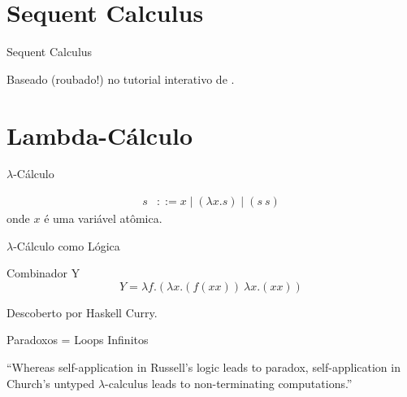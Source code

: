 \documentclass{beamer}
\begin{document}
\section{Sequent Calculus}

\begin{frame}{Sequent Calculus}

Baseado (roubado!) no tutorial interativo de \cite{yanglogitext2012}.

\end{frame}

\section{Lambda-Cálculo}

\begin{frame}{$\lambda$-Cálculo}

\begin{block}{}

\begin{align*}
s &::=  x \mid (\lambda x.s) \mid (s ~ s)
\end{align*}
onde $x$ é uma variável atômica.

\end{block}

\end{frame}


\begin{frame}{$\lambda$-Cálculo como Lógica}

\begin{block}{Combinador Y}
\vskip2mm
\begin{equation}
Y = \lambda f.(\lambda x.(f (x x)) ~\lambda x.(x x))
\end{equation}
\vskip2mm

Descoberto por Haskell Curry.

\end{block}

\end{frame}


\begin{frame}{Paradoxos = Loops Infinitos}

\begin{exampleblock}{}
\justify
  {\large ``Whereas self-application in Russell’s logic leads to paradox, self-application in Church’s untyped $\lambda$-calculus leads to non-terminating computations.''}
  \vskip5mm
  \hspace*{}
\end{exampleblock}

\end{frame}
\end{document}

